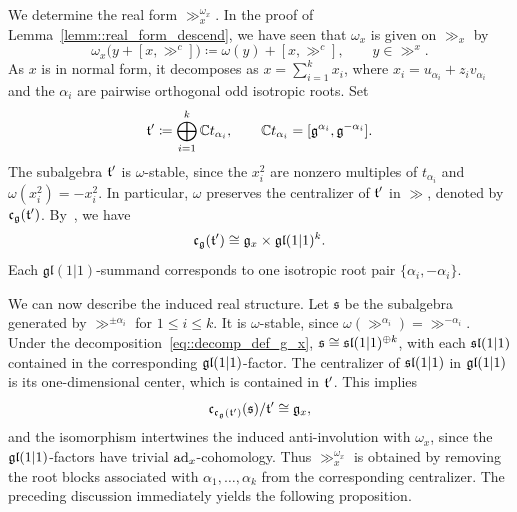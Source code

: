 We determine the real form $\gg_x^{\omega_x}$. In the proof of Lemma~\ref{lemm::real_form_descend}, we have seen that $\omega_{x}$ is given on $\gg_{x}$ by 
\begin{equation}
\omega_x\bigl(y+[x,\gg^c]\bigr)
\coloneqq
\omega(y)+[x,\gg^c],
\qquad y\in\gg^x.
\end{equation}
As $x$ is in normal form,  it decomposes as $x=\sum_{i=1}^{k}x_i$, where $x_i=u_{\alpha_i}+z_i v_{\alpha_i}$ and the $\alpha_{i}$ are pairwise orthogonal odd isotropic roots. Set
\begin{equation}
\tt'\coloneqq\bigoplus_{i=1}^{k}\CC t_{\alpha_i},
\qquad
\CC t_{\alpha_i}=[\gg^{\alpha_i},\gg^{-\alpha_i}].
\end{equation}
The subalgebra $\tt'$ is $\omega$-stable, since the $x_i^2$ are nonzero multiples of $t_{\alpha_i}$ and $\omega(x_i^2)=-x_i^2$. In particular, $\omega$ preserves the centralizer of $\tt'$ in $\gg$, denoted by $\mathfrak c_{\gg}(\tt')$. By~\cite[Theorem~3.12]{Sherman2025}, we have
\begin{equation}\label{eq::decomp_def_g_x}
\mathfrak c_{\gg}(\tt')
\cong
\gg_x\times\mathfrak{gl}(1\vert1)^k.
\end{equation}
Each \(\mathfrak{gl}(1\vert1)\)-summand corresponds to one isotropic root pair \(\{\alpha_i,-\alpha_i\}\).


We can now describe the induced real structure. Let $\mathfrak s$ be the subalgebra generated by $\gg^{\pm\alpha_i}$ for $1\leq i\leq k$. It is $\omega$-stable, since $\omega(\gg^{\alpha_i})=\gg^{-\alpha_i}$. Under the decomposition~\eqref{eq::decomp_def_g_x}, $\mathfrak s\cong\sl(1\vert1)^{\oplus k}$, with each $\sl(1\vert1)$ contained in the corresponding $\gl(1\vert1)$-factor. The centralizer of $\sl(1\vert1)$ in $\gl(1\vert1)$ is its one-dimensional center, which is contained in $\tt'$. This implies 
\begin{equation}
\mathfrak c_{\mathfrak c_{\gg}(\tt')}(\mathfrak s)/\tt'\cong\gg_x,
\end{equation}
and the isomorphism intertwines the induced anti-involution with $\omega_x$, since the $\gl(1\vert1)$-factors have trivial $\ad_x$-cohomology. Thus $\gg_x^{\omega_x}$ is obtained by removing the root blocks associated with $\alpha_1,\ldots,\alpha_k$ from the corresponding centralizer. The preceding discussion immediately yields the following proposition.

